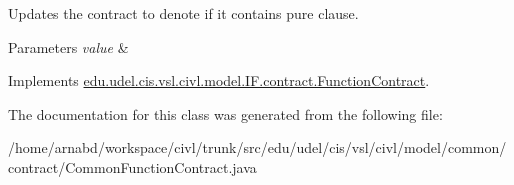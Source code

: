 Updates the contract to denote if it contains {\ttfamily pure} clause. 


\begin{DoxyParams}{Parameters}
{\em value} & \\
\hline
\end{DoxyParams}


Implements \hyperlink{interfaceedu_1_1udel_1_1cis_1_1vsl_1_1civl_1_1model_1_1IF_1_1contract_1_1FunctionContract_a3c48a4d4395c17f6415f43ece99f1b36}{edu.\+udel.\+cis.\+vsl.\+civl.\+model.\+I\+F.\+contract.\+Function\+Contract}.



The documentation for this class was generated from the following file\+:\begin{DoxyCompactItemize}
\item 
/home/arnabd/workspace/civl/trunk/src/edu/udel/cis/vsl/civl/model/common/contract/Common\+Function\+Contract.\+java\end{DoxyCompactItemize}
